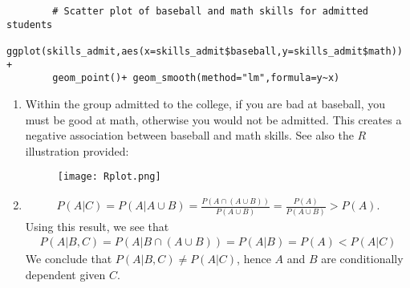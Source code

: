 \begin{exercise}[BH.2.36]
\begin{solution}
\begin{verbatim}
		# Scatter plot of baseball and math skills for admitted students
		ggplot(skills_admit,aes(x=skills_admit$baseball,y=skills_admit$math)) +
		geom_point()+ geom_smooth(method="lm",formula=y~x)
	\end{verbatim}
	\begin{enumerate}
		\item Within the group admitted to the college, if you are bad at baseball, you must be good at math, otherwise you would not be admitted. This creates a negative association between baseball and math skills. See also the $R$ illustration provided:
		\begin{figure}[htbp!]
			\texttt{[image: Rplot.png]}
		\end{figure}
		\item \begin{align*}
			P(A|C) =P(A|A\cup B) = \frac{P(A\cap(A\cup B))}{P(A\cup B)} = \frac{P(A)}{P(A\cup B)}>P(A).
		\end{align*}
		Using this result, we see that
		\begin{align*}
			P(A|B,C) = P(A|B\cap (A\cup B)) =P(A|B) = P(A)<P(A|C)
		\end{align*}
		We conclude that $P(A|B,C)\neq P(A|C)$, hence $A$ and $B$ are conditionally dependent given $C$.
	\end{enumerate}
\end{solution}
\end{exercise}

